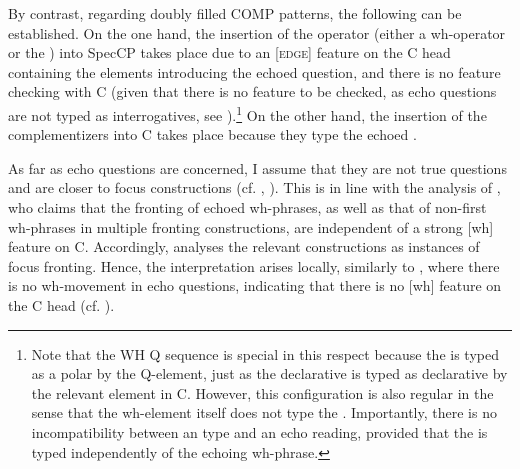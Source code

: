 \documentclass[output=paper,modfonts, hidelinks, newtxmath]{langscibook}
\begin{document}
\largerpage[-2]
By contrast, regarding  doubly filled COMP patterns, the following can be established. On the one hand, the insertion of the operator (either a wh-op\-er\-a\-tor or the ) into SpecCP takes place due to an [\textsc{edge}] feature on the C head containing the elements introducing the echoed question, and there is no feature checking with C (given that there is no  feature to be checked, as echo questions are not typed as interrogatives, see \citealt[363]{boskovic2002}).\footnote{Note that the WH Q sequence is special in this respect because the  is typed as a polar  by the Q-element, just as the declarative  is typed as declarative by the relevant element in C. However, this configuration is also regular in the sense that the wh-element itself does not type the . Importantly, there is no incompatibility between an   type and an echo reading, provided that the  is typed independently of the echoing wh-phrase.} On the other hand, the insertion of the complementizers into C takes place because they type the echoed .

As far as echo questions are concerned, I assume that they are not true questions and are closer to focus constructions (cf. \citealt{boskovic2002}, \citealt{artsein2002}). This is in line with the analysis of \citet{boskovic2002}, who claims that the fronting of echoed wh-phrases, as well as that of non-first wh-phrases in multiple fronting constructions, are independent of a strong [wh] feature on C. Accordingly, \citet[359--364]{boskovic2002} analyses the relevant constructions as instances of focus fronting. Hence, the  interpretation arises locally, similarly to , where there is no wh-movement in echo questions, indicating that there is no [wh] feature on the C head (cf. \citealt[363]{boskovic2002}).
\end{document}
